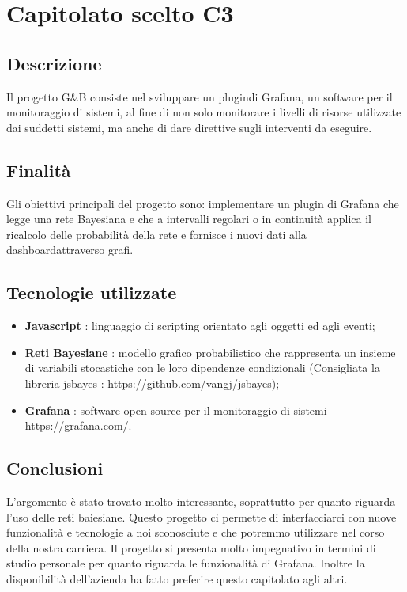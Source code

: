 \section{Capitolato scelto C3}
	\subsection{Descrizione}
		Il progetto G\&B consiste nel sviluppare un plugin\pedice di Grafana\pedice, un software per il monitoraggio di sistemi, al fine di non solo monitorare i livelli di risorse utilizzate dai suddetti sistemi, ma anche di dare direttive sugli interventi da eseguire.
	\subsection{Finalità}
		Gli obiettivi principali del progetto sono: implementare un plugin di Grafana che legge una rete Bayesiana e che a intervalli regolari o in continuità applica il ricalcolo delle probabilità della rete e fornisce i nuovi dati alla dashboard\pedice attraverso grafi.
	\subsection{Tecnologie utilizzate}
		\begin{itemize}
			\item \textbf{Javascript\pedice} : linguaggio di scripting orientato agli oggetti ed agli eventi;
			\item \textbf{Reti Bayesiane\pedice} : modello grafico probabilistico che rappresenta un insieme di variabili stocastiche con le loro dipendenze condizionali (Consigliata la libreria jsbayes : \url{https://github.com/vangj/jsbayes});
			\item \textbf{Grafana} : software open source per il monitoraggio di sistemi \url{https://grafana.com/}.
		\end{itemize}
	\subsection{Conclusioni}
		L'argomento è stato trovato molto interessante, soprattutto per quanto riguarda l'uso delle reti baiesiane. Questo progetto ci permette di interfacciarci con nuove funzionalità e tecnologie a noi sconosciute e che potremmo utilizzare nel corso della nostra carriera.
		Il progetto si presenta molto impegnativo in termini di studio personale per quanto riguarda le funzionalità di Grafana.
		Inoltre la disponibilità dell'azienda ha fatto preferire questo capitolato agli altri.